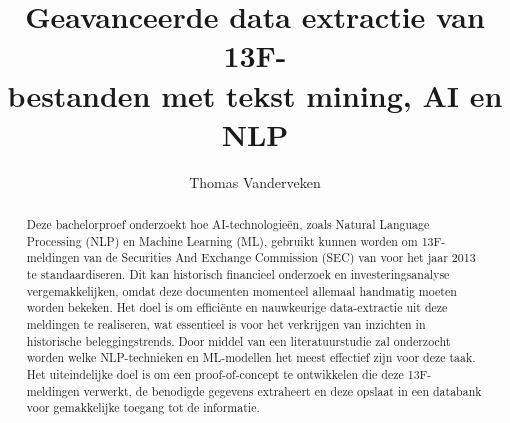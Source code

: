 \documentclass{hogent-article}
\title{Geavanceerde data extractie van 13F-\\bestanden met tekst mining, AI en NLP}
\author{Thomas Vanderveken}
\begin{document}
\begin{abstract}
Deze bachelorproef onderzoekt hoe AI-technologieën, zoals Natural Language Processing (NLP) en Machine Learning (ML), gebruikt kunnen worden om 13F-meldingen van de Securities And Exchange Commission (SEC) van voor het jaar 2013 te standaardiseren. Dit kan historisch financieel onderzoek en investeringsanalyse vergemakkelijken, omdat deze documenten momenteel allemaal handmatig moeten worden bekeken. Het doel is om efficiënte en nauwkeurige data-extractie uit deze meldingen te realiseren, wat essentieel is voor het verkrijgen van inzichten in historische beleggingstrends. Door middel van een literatuurstudie zal onderzocht worden welke NLP-technieken en ML-modellen het meest effectief zijn voor deze taak. Het uiteindelijke doel is om een proof-of-concept te ontwikkelen die deze 13F-meldingen verwerkt, de benodigde gegevens extraheert en deze opslaat in een databank voor gemakkelijke toegang tot de informatie.
\end{abstract}

\tableofcontents



\printbibliography[heading=bibintoc]
\end{document}
